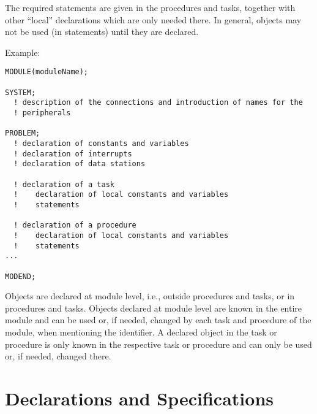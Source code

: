 The required statements are given in the procedures and tasks,
together with other ``local'' declarations which are only needed there.
In general, objects may not be used (in statements) until they are
declared.

Example:

%
%
%
%
%
%
\begin{lstlisting}
MODULE(moduleName);

SYSTEM;
  ! description of the connections and introduction of names for the
  ! peripherals

PROBLEM;
  ! declaration of constants and variables
  ! declaration of interrupts
  ! declaration of data stations

  ! declaration of a task
  !    declaration of local constants and variables
  !    statements

  ! declaration of a procedure
  !    declaration of local constants and variables
  !    statements
...

MODEND;
\end{lstlisting}

Objects are declared at module level, i.e., outside procedures and
tasks, or in procedures and tasks. Objects declared at module level are
known in the entire module and can be used or, if needed, changed by
each task and procedure of the module, when mentioning the identifier.
A declared object in the task or procedure is only known in the
respective task or procedure and can only be used or, if needed,
changed there.

\section{Declarations and Specifications} %
\label{sec_dcl_and_spc}

